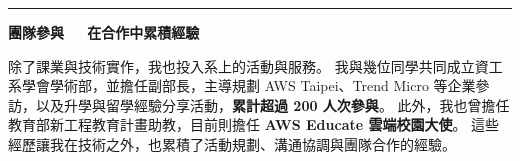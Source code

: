 \documentclass[10.5pt,a4paper]{article}
\newcommand{\cjktitlefont}{}
\newcommand{\sechead}[2]{%
  {\color{bluemed}\rule{3.6pt}{15pt}}\hspace{7pt}%
  {\cjktitlefont\bfseries\fontsize{14}{16}\selectfont\color{bluemed}#1}%
  {\fontsize{13}{16}\selectfont\color{bluemed}\ \textbar\ }%
  {\cjktitlefont\bfseries\fontsize{13}{16}\selectfont\color{bluemed}#2}\par
}
\newcommand{\secbody}[1]{%
  \vspace{5pt}
  {\color{ink}\fontsize{10.3}{16.5}\selectfont #1\par}
}
\begin{document}
\vspace{11pt}



\sechead{團隊參與}{在合作中累積經驗}

\secbody{
除了課業與技術實作，我也投入系上的活動與服務。
我與幾位同學共同成立資工系學會學術部，並擔任副部長，主導規劃 AWS Taipei、Trend Micro 等企業參訪，以及升學與留學經驗分享活動，\textbf{累計超過 200 人次參與}。
此外，我也曾擔任教育部新工程教育計畫助教，目前則擔任 \textbf{AWS Educate 雲端校園大使}。
這些經歷讓我在技術之外，也累積了活動規劃、溝通協調與團隊合作的經驗。
}
\end{document}
